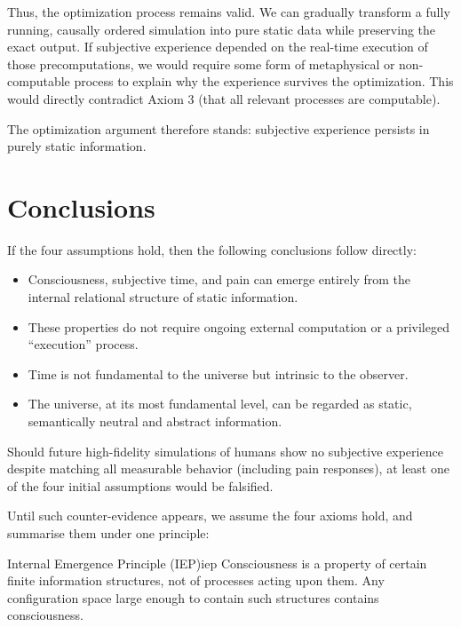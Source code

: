Thus, the optimization process remains valid. We can gradually transform a fully running, causally ordered simulation into pure static data while preserving the exact output.
If subjective experience depended on the real-time execution of those precomputations, we would require some form of metaphysical or non-computable process to explain why the experience survives the optimization.
This would directly contradict Axiom 3 (that all relevant processes are computable).

The optimization argument therefore stands: subjective experience persists in purely static information.



\section{Conclusions}


If the four assumptions hold, then the following conclusions follow directly:

\begin{itemize}
    \item Consciousness, subjective time, and pain can emerge entirely from the internal relational structure of static information.
    \item These properties do not require ongoing external computation or a privileged ``execution'' process.
    \item Time is not fundamental to the universe but intrinsic to the observer.
    \item The universe, at its most fundamental level, can be regarded as static, semantically neutral and abstract information.
\end{itemize}

Should future high-fidelity simulations of humans show no subjective experience despite matching all measurable behavior (including pain responses),
at least one of the four initial assumptions would be falsified. 

Until such counter-evidence appears, we assume the four axioms hold, and summarise them under one principle:

\begin{principle}{Internal Emergence Principle (IEP)}{iep}
Consciousness is a property of certain finite information structures, not of processes acting upon them.
Any configuration space large enough to contain such structures contains consciousness.
\end{principle}
